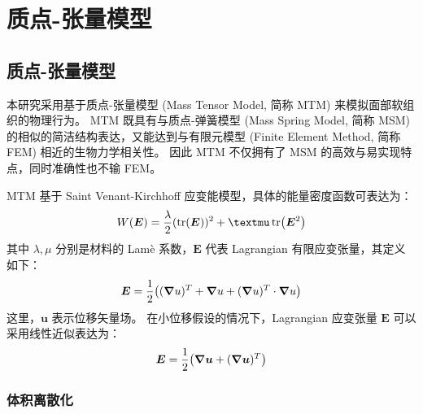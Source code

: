 
\chapter{质点-张量模型}
\label{cha:mtm}

\section{质点-张量模型}

本研究采用基于质点-张量模型 (Mass Tensor Model, 简称 MTM)\cite{cotinHybridElasticModel2000} 来模拟面部软组织的物理行为。
MTM 既具有与质点-弹簧模型 (Mass Spring Model, 简称 MSM) 的相似的简洁结构表达，又能达到与有限元模型 (Finite Element Method, 简称 FEM) 相近的生物力学相关性。
因此 MTM 不仅拥有了 MSM 的高效与易实现特点，同时准确性也不输 FEM。

MTM 基于 Saint Venant-Kirchhoff 应变能模型，具体的能量密度函数可表达为：
\begin{equation} \label{eq:mtm-energy}
  W(\bm{E}) = \frac{\lambda}{2} (\tr(\bm{E}))^2 + \mu \tr(\bm{E}^2)
\end{equation}
其中 $\lambda, \mu$ 分别是材料的 Lam\`e 系数，$\bm{E}$ 代表 Lagrangian 有限应变张量，其定义如下：
\begin{equation}
  \bm{E} = \frac{1}{2} \pqty{(\grad{u})^T + \grad{u} + (\grad{u})^T \cdot \grad{u}}
\end{equation}
这里，$\bm{u}$ 表示位移矢量场。
在小位移假设的情况下，Lagrangian 应变张量 $\bm{E}$ 可以采用线性近似表达为：
\begin{equation}
  \bm{E} = \frac{1}{2} \pqty{\grad{\bm{u}} + (\grad{\bm{u}})^T}
\end{equation}

\subsection{体积离散化}

